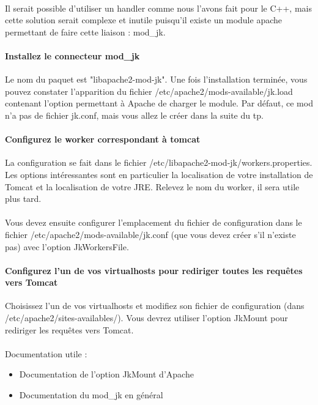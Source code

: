 \documentclass[12pt,a4paper]{article}
\begin{document}
\paragraph{}
Il serait possible d'utiliser un handler comme nous l'avons fait pour le C++, mais cette solution serait complexe et inutile puisqu'il existe un module apache permettant de faire cette liaison : mod\_jk.

\paragraph{Installez le connecteur mod\_jk\\}
Le nom du paquet est "libapache2-mod-jk". Une fois l'installation terminée, vous pouvez constater l'apparition du fichier /etc/apache2/mods-available/jk.load contenant l'option permettant à Apache de charger le module. Par défaut, ce mod n'a pas de fichier jk.conf, mais vous allez le créer dans la suite du tp.

\paragraph{Configurez le worker correspondant à tomcat\\}
La configuration se fait dans le fichier /etc/libapache2-mod-jk/workers.properties. Les options intéressantes sont en particulier la localisation de votre installation de Tomcat et la localisation de votre JRE. Relevez le nom du worker, il sera utile plus tard.

\paragraph{}
Vous devez ensuite configurer l'emplacement du fichier de configuration dans le fichier /etc/apache2/mods-available/jk.conf (que vous devez créer s'il n'existe pas) avec l'option JkWorkersFile.

\paragraph{Configurez l'un de vos virtualhosts pour rediriger toutes les requêtes vers Tomcat\\}
Choisissez l'un de vos virtualhosts et modifiez son fichier de configuration (dans /etc/apache2/sites-availables/). Vous devrez utiliser l'option JkMount pour rediriger les requêtes vers Tomcat.

\paragraph{}
Documentation utile : 
\begin{itemize}
\item Documentation de l'option JkMount d'Apache
\item Documentation du mod\_jk en général
\end{itemize}
\end{document}
